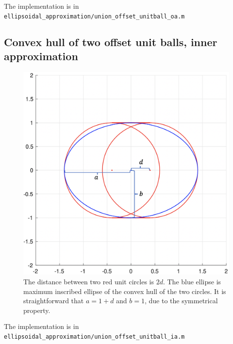 \documentclass{article}
\begin{document}
The implementation is in \texttt{ellipsoidal\_approximation/union\_offset\_unitball\_oa.m}

\subsection{Convex hull of two offset unit balls, inner approximation}
\begin{figure}[H]
	\centering
	\includegraphics[width=0.5\linewidth]{union_offset_unitball_ia/1.png}
	\caption{The distance between two red unit circles is $2d$. The blue ellipse is maximum inscribed ellipse of the convex hull of the two circles. It is straightforward that $a=1+d$ and $b = 1$, due to the symmetrical property.}
	\label{union_offset_unitball_ia}
\end{figure}
The implementation is in \texttt{ellipsoidal\_approximation/union\_offset\_unitball\_ia.m}
\end{document}
